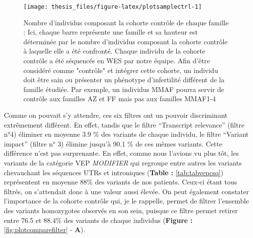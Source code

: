 \documentclass[12pt,twoside]{reedthesis}
\theoremstyle{definition}
\theoremstyle{definition}
\theoremstyle{remark}
\begin{document}
  \begin{figure}
  
  {\centering \texttt{[image: thesis\_files/figure-latex/plotsamplectrl-1]} 
  
  }
  
  \caption[Nombre d'individus composant la cohorte contrôle de chaque famille]{Nombre d'individus composant la cohorte contrôle de chaque famille : Ici, chaque barre représente une famille et sa hauteur est déterminée par le nombre d'individus composant la cohorte contrôle à laquelle elle a été confronté. Chaque individu de la cohorte contrôle a été séquencés en WES par notre équipe. Afin d'être considéré comme "contrôle" et intégrer cette cohorte, un individu doit être sain ou présenter un phénotype d'infertilité différent de la famille étudiée. Par exemple, un individus MMAF pourra servir de contrôle aux familles AZ et FF mais pas aux familles MMAF1-4}\label{fig:plotsamplectrl}
  \end{figure}
  
  \newpage
  
  \newpage
  
  Comme on pouvait s'y attendre, ces six filtres ont un pouvoir
  discriminant extrêmement différent. En effet, tandis que le filtre
  ``Transcript relevance'' (filtre n°4) éliminer en moyenne 3.9 \% des
  variants de chaque individu, le filtre ``Variant impact'' (filtre n° 3)
  élimine jusqu'à 90.1 \% de ces mêmes variants. Cette différence n'est
  pas surprenante. En effet, comme nous l'avions vu plus tôt, les variants
  de la catégorie VEP \emph{MODIFIER} qui regroupe entre autres les
  variants chevauchant les séquences UTRs et introniques (\textbf{Table :}
  \ref{tab:tabvepcsq}) représentent en moyenne 88\% des variants de nos
  patients. Ceux-ci étant tous filtrés, on s'attendait donc à une valeur
  aussi élevée. On peut également constater l'importance de la cohorte
  contrôle qui, je le rappelle, permet de filtrer l'ensemble des variants
  homozygotes observés en son sein, puisque ce filtre permet retirer entre
  76.5 et 88.4\% des variants de chaque individus (\textbf{Figure :}
  \ref{fig:plotcomparefilter} - \textbf{A}).
  
\end{document}
